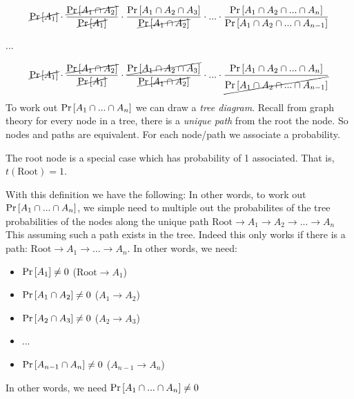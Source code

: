 $$
\cancel{\text{Pr}\left[A_1\right]} 
\cdot \frac{\cancel{\text{Pr}\left[A_1 \cap A_2\right]}}{\cancel{\text{Pr}\left[A_1\right]}} 
\cdot \frac{\text{Pr}\left[A_1 \cap A_2 \cap A_3\right]}{\cancel{\text{Pr}\left[A_1 \cap A_2\right]}}
\cdot ... 
\cdot \frac{\text{Pr}\left[A_1 \cap A_2 \cap ... \cap A_n\right]}{\text{Pr}\left[A_1 \cap A_2 \cap ... \cap A_{n-1}\right]}
$$
\begin{center}
...
\end{center}
$$
\cancel{\text{Pr}\left[A_1\right]} 
\cdot \frac{\cancel{\text{Pr}\left[A_1 \cap A_2\right]}}{\cancel{\text{Pr}\left[A_1\right]}} 
\cdot \frac{\cancel{\text{Pr}\left[A_1 \cap A_2 \cap A_3\right]}}{\cancel{\text{Pr}\left[A_1 \cap A_2\right]}}
\cdot ... 
\cdot \frac{\text{Pr}\left[A_1 \cap A_2 \cap ... \cap A_n\right]}{\cancel{\text{Pr}\left[A_1 \cap A_2 \cap ... \cap A_{n-1}\right]}}
$$

To work out $\text{Pr}\left[A_1 \cap ... \cap A_n\right]$ we can draw a \textit{tree diagram}. 
Recall from graph theory for every node in a tree, there is a \textit{unique path} 
from the root the node. So nodes and paths are 
equivalent. For each node/path we associate a probability.

The root node is a special case which has probability of 1 associated. That is, 
$t(\text{Root}) = 1$. 

With this definition we have the following:
In other words, to work out $\text{Pr}\left[A_1 \cap ... \cap A_n\right]$, 
we simple need to multiple out the probabilites of the 
tree probabilities of the nodes along the unique path 
$\text{Root} \rightarrow A_1 \rightarrow A_2 \rightarrow ... \rightarrow A_n$ 
This assuming such a path exists in the tree.
Indeed this only works if there is a path: $\text{Root} \rightarrow A_1 \rightarrow  ... \rightarrow  A_n$. 
In other words, we need:
\begin{itemize}
\item $\text{Pr}\left[A_1\right] \neq 0$ ($\text{Root} \rightarrow A_1$)
\item $\text{Pr}\left[A_1 \cap A_2\right] \neq 0$ ($A_1 \rightarrow A_2$)
\item $\text{Pr}\left[A_2 \cap A_3\right] \neq 0$ ($A_2 \rightarrow A_3$)
\item ... 
\item $\text{Pr}\left[A_{n-1} \cap A_n\right] \neq 0$ ($A_{n-1} \rightarrow A_n$)
\end{itemize}
In other words, we need $\text{Pr}\left[A_1 \cap ... \cap A_n\right] \neq 0$

